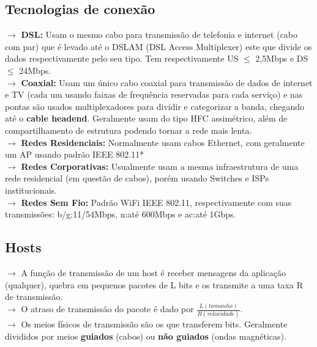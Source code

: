\documentclass[12pt]{article}
\begin{document}
    \subsection{Tecnologias de conexão}
    $\rightarrow$ \textbf{DSL:} Usam o mesmo cabo para transmissão de telefonia e internet (cabo com par) que é levado até o DSLAM (DSL Access Multiplexer) este que divide os dados respectivamente pelo seu tipo. Tem respectivamente US $\leq$ 2,5Mbps e DS $\leq$ 24Mbps.
    \\$\rightarrow$ \textbf{Coaxial:} Usam um único cabo coaxial para transmissão de dados de internet e TV (cada um usando faixas de frequência reservadas para cada serviço) e nas pontas são usados multiplexadores para dividir e categorizar a banda, chegando até o \textbf{cable headend}. Geralmente usam do tipo HFC assimétrico, além de compartilhamento de estrutura podendo tornar a rede mais lenta.
    \\$\rightarrow$ \textbf{Redes Residenciais:} Normalmente usam cabos Ethernet, com geralmente um AP usando padrão IEEE 802.11*
    \\$\rightarrow$ \textbf{Redes Corporativas:} Usualmente usam a mesma infraestrutura de uma rede residencial (em questão de cabos), porém usando Switches e ISPs institucionais.
    \\$\rightarrow$ \textbf{Redes Sem Fio:} Padrão WiFi IEEE 802.11, respectivamente com suas transmissões: b/g:11/54Mbps, n:até 600Mbps e ac:até 1Gbps.

    \subsection{Hosts}
    $\rightarrow$ A função de transmissão de um host é receber mensagens da aplicação (qualquer), quebra em pequenos pacotes de L bits e os transmite a uma taxa R de transmissão.
    \\$\rightarrow$ O atraso de transmissão do pacote é dado por $\frac{L (tamanho)}{R (velocidade)}$.
    \\$\rightarrow$ Os meios físicos de transmissão são os que transferem bits. Geralmente divididos por meios \textbf{guiados} (cabos) ou \textbf{não guiados} (ondas magnéticas).
    
\end{document}
